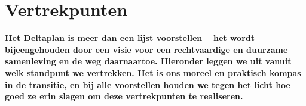 \chapter{Vertrekpunten}

\begin{mdframed}[
	style=borderless-pink-pastel,
	innertopmargin=15pt,
	innerrightmargin=18pt,
	innerbottommargin=15pt,
	innerleftmargin=18pt
]

{ 
\bfseries \large Het Deltaplan is meer dan een lijst voorstellen -- het wordt bijeengehouden door een visie voor een rechtvaardige en duurzame samenleving en de weg daarnaartoe. Hieronder leggen we uit vanuit welk standpunt we vertrekken. Het is ons moreel en praktisch kompas in de transitie, en bij alle voorstellen houden we tegen het licht hoe goed ze erin slagen om deze vertrekpunten te realiseren.

}
\end{mdframed}

\begin{multicols}{2}
















\end{multicols}
